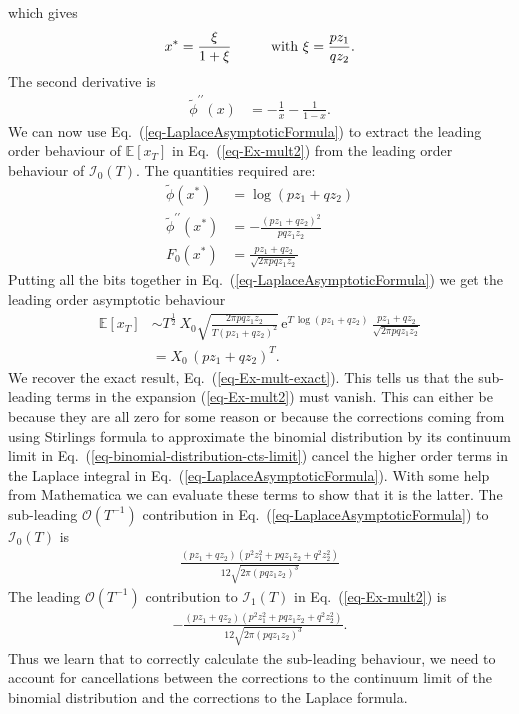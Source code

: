 \documentclass[11pt]{article}
\begin{document}
which gives
\begin{align}
\label{eq-xStar-mult}
x^* = \frac{\xi}{1+\xi} \hspace{1.0cm}\text{with }\xi = \frac{p z_1}{q z_2}.
\end{align}
The second derivative is
\begin{align*}
\widetilde{\phi}^{\prime\prime} (x) &= -\frac{1}{x} - \frac{1}{1-x}.
\end{align*}
We can now use Eq.~(\ref{eq-LaplaceAsymptoticFormula}) to extract the leading order behaviour
of  $\mathbb{E}\left[x_T \right]$ in Eq.~(\ref{eq-Ex-mult2}) from the leading order behaviour of $\mathcal{I}_0(T)$. The quantities required are:
\begin{align}
\widetilde{\phi} (x^*) & = \log\left( p z_1 + q z_2 \right)\\ 
\widetilde{\phi}^{\prime\prime} (x^*) &= - \frac{(p z_1 + q z_2)^2}{ p q z_1 z_2}\\
F_0(x^*) & = \frac{p z_1 + q z_2}{\sqrt{2 \pi p q z_1 z_2 }}
\end{align}
Putting all the bits together in  Eq.~(\ref{eq-LaplaceAsymptoticFormula}) we get the leading order asymptotic behaviour
\begin{align}
\nonumber \mathbb{E}\left[x_T \right] &\sim T^\frac{1}{2} \, X_0 \sqrt{\frac{2 \pi p q z_1 z_2}{T (p z_1 + q z_2)^2}} \,\mathrm{e}^{T\, \log\left( p z_1 + q z_2 \right)}\,  \frac{p z_1 + q z_2}{\sqrt{2 \pi p q z_1 z_2 }}\\
&= X_0\,  (p z_1 + q z_2)^T.
\end{align}
We recover the exact result, Eq.~(\ref{eq-Ex-mult-exact}). This tells us that the sub-leading terms in the expansion (\ref{eq-Ex-mult2}) must vanish.
This can either be because they are all zero for some reason or because the corrections coming from using Stirlings formula to approximate the binomial distribution by its continuum limit in Eq.~(\ref{eq-binomial-distribution-cts-limit}) cancel the higher order terms in the Laplace integral in Eq.~(\ref{eq-LaplaceAsymptoticFormula}).
With some help from Mathematica we can evaluate these terms to show that it is the latter.
The sub-leading  $\mathcal{O}(T^{-1})$ contribution in Eq.~(\ref{eq-LaplaceAsymptoticFormula}) to $\mathcal{I}_0(T)$ is
\begin{align*}
\frac{ (p z_1 + q z_2)\left(p^2 z_1^2 + p q z_1 z_2 + q^2 z_2^2 \right)}{12 \sqrt{2 \pi  (p q z_1 z_2)^3}}
\end{align*}
The  leading  $\mathcal{O}(T^{-1})$ contribution to $\mathcal{I}_1(T)$ in Eq.~(\ref{eq-Ex-mult2}) is
\begin{align*}
- \frac{ (p z_1 + q z_2)\left(p^2 z_1^2 + p q z_1 z_2 + q^2 z_2^2 \right)}{12 \sqrt{2 \pi  (p q z_1 z_2)^3}}.
\end{align*}
Thus we learn that to correctly calculate the sub-leading behaviour, we need to account for cancellations between the corrections to the continuum limit of the binomial distribution and the corrections to the Laplace formula.
\end{document}
